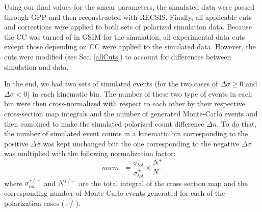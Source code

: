 Using our final values for the smear parameters, the simulated data were passed through GPP and then reconstructed with RECSIS. 
 Finally, all applicable cuts %
  and corrections were applied to both sets of polarized simulation data. Because the CC was turned of in GSIM for the simulation, 
 all experimental data cuts except those depending on CC were %
  applied to the simulated data. However, the cuts were modified (see Sec. \ref{allCuts}) to account for differences between simulation and data.

In the end, we had two sets of simulated events (for the two cases of $\Delta \sigma \geq 0 $ and $\Delta \sigma < 0$) in each kinematic bin. The number of these two type of events in each bin were then cross-normalized with respect to each other by their respective cross-section map integrals %
and the number of %
generated Monte-Carlo events and then combined to make the simulated polarized count difference $\Delta n$. To do that, the number of simulated event counts in a kinematic bin corresponding to the positive $\Delta \sigma$ %
was kept unchanged but the one corresponding to the negative $\Delta \sigma$ %
was multiplied with the following normalization factor:
\begin{equation}
 norm^- = \frac{\sigma^-_{tot}}{\sigma^+_{tot}}\times \frac{N^+}{N^-}
\end{equation}
where $\sigma^{+/-}_{tot}$ and $N^{+/-}$ are the total integral %
of the cross section map and the corresponding number of Monte-Carlo events generated for each of the polarization cases (+/-).




